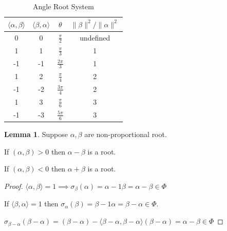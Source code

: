 \documentclass{article}
\theoremstyle{definition}
\newtheorem{lemma}[theorem]{Lemma}
\begin{document}
\begin{table}[H]
    \centering
    \begin{tabular}{c|c|c|c}
        \toprule
            \(\langle \alpha , \beta \rangle \) & \(\langle \beta , \alpha \rangle \)  & \(\theta\) &  \(\lVert \beta  \rVert ^2 / \lVert \alpha \rVert ^2\)  \\
        \midrule
            0 & 0 & \(\frac{\pi}{2}\) & undefined \\
            1 & 1 & \(\frac{\pi}{3}\) & 1  \\
            -1 & -1 & \(\frac{2\pi}{3}\) & 1 \\
            1 & 2 & \(\frac{\pi}{4}\) & 2 \\
            -1 & -2 & \(\frac{3\pi}{4}\) & 2  \\
            1 & 3 & \(\frac{\pi}{6}\)  & 3 \\
            -1 & -3 & \(\frac{5\pi}{6}\) & 3 \\
        \bottomrule
    \end{tabular}
    \caption{Angle Root System}
    \label{tab:rootsystable}
\end{table}

\begin{lemma}
    Suppose \(\alpha ,\beta \) are non-proportional root.
    
    If \((\alpha ,\beta) > 0\) then \(\alpha  - \beta \) is a root.

    If \((\alpha ,\beta ) < 0\) then \(\alpha + \beta \) is a root.

\end{lemma}

\begin{proof}
    \(\langle \alpha ,\beta  \rangle = 1 \implies \sigma_\beta (\alpha) = \alpha - 1\beta = \alpha - \beta  \in \Phi\) 

    If \(\langle \beta ,\alpha  \rangle = 1\) then \(\sigma_\alpha(\beta) = \beta - 1\alpha = \beta -\alpha \in \Phi\).
    
    \(\sigma_{\beta - \alpha}(\beta - \alpha) = (\beta - \alpha) - \langle \beta -\alpha , \beta -\alpha  \rangle (\beta -\alpha ) = \alpha - \beta \in \Phi\) 
\end{proof}
\end{document}
